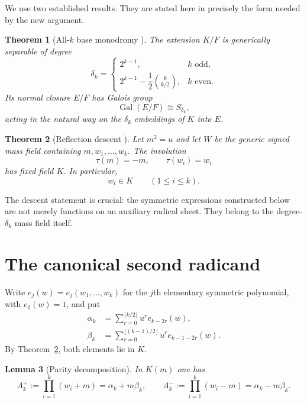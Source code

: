 \documentclass[11pt,a4paper]{article}
\newtheorem{theorem}{Theorem}[section]
\newtheorem{lemma}[theorem]{Lemma}
\theoremstyle{definition}
\theoremstyle{remark}
\newcommand{\Gal}{\operatorname{Gal}}
\begin{document}
We use two established results.  They are stated here in precisely the form
needed by the new argument.

\begin{theorem}[All-$k$ base monodromy \cite{WeightedMonodromy}]
\label{thm:base}
The extension $K/F$ is generically separable of degree
\begin{equation}
 \delta_k=
 \begin{cases}
 2^{k-1},&k\text{ odd},\\[2mm]
 2^{k-1}-\dfrac12\binom{k}{k/2},&k\text{ even}.
 \end{cases}
 \label{eq:delta}
\end{equation}
Its normal closure $E/F$ has Galois group
\[
 \Gal(E/F)\cong S_{\delta_k},
\]
acting in the natural way on the $\delta_k$ embeddings of $K$ into $E$.
\end{theorem}

\begin{theorem}[Reflection descent \cite{ReflectionDescent}]
\label{thm:descent}
Let $m^2=u$ and let $W$ be the generic signed mass field containing
$m,w_1,\ldots,w_k$.  The involution
\[
 \tau(m)=-m,\qquad \tau(w_i)=w_i
\]
has fixed field $K$.  In particular,
\[
 w_i\in K\qquad(1\leq i\leq k).
\]
\end{theorem}

The descent statement is crucial: the symmetric expressions constructed
below are not merely functions on an auxiliary radical sheet.  They belong to
the degree-$\delta_k$ mass field itself.

\section{The canonical second radicand}
\label{sec:radicand}

Write $e_j(w)=e_j(w_1,\ldots,w_k)$ for the $j$th elementary symmetric
polynomial, with $e_0(w)=1$, and put
\begin{align}
 \alpha_k
 &=\sum_{r=0}^{\lfloor k/2\rfloor}u^r e_{k-2r}(w),
 \label{eq:alpha}\\
 \beta_k
 &=\sum_{r=0}^{\lfloor(k-1)/2\rfloor}u^r e_{k-1-2r}(w).
 \label{eq:beta}
\end{align}
By Theorem~\ref{thm:descent}, both elements lie in $K$.

\begin{lemma}[Parity decomposition]
\label{lem:decomposition}
In $K(m)$ one has
\begin{equation}
 A_k^+:=\prod_{i=1}^k(w_i+m)=\alpha_k+m\beta_k,
 \qquad
 A_k^-:=\prod_{i=1}^k(w_i-m)=\alpha_k-m\beta_k.
 \label{eq:Apm}
\end{equation}
\end{lemma}
\end{document}
